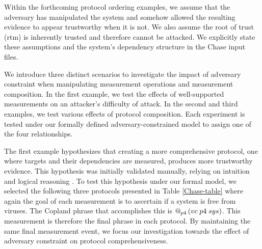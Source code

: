 \documentclass[runningheads]{llncs}
\theoremstyle{definition}
\begin{document}

%     

Within the forthcoming protocol ordering examples, we assume that the adversary has manipulated the system and somehow allowed the resulting evidence to appear trustworthy when it is not. We also assume the root of trust (rtm) is inherently trusted and therefore cannot be attacked. We explicitly state these assumptions and the system's dependency structure in the Chase input files.

We introduce three distinct scenarios to investigate the impact of adversary constraint when manipulating measurement operations and measurement composition. In the first example, we test the effects of well-supported measurements on an attacker's difficulty of attack. In the second and third examples, we test various effects of protocol composition. Each experiment is tested under our formally defined adversary-constrained model to assign one of the four relationships.

The first example hypothesizes that creating a more comprehensive protocol, one where targets and their dependencies are measured, produces more trustworthy evidence. This hypothesis was initially validated manually, relying on intuition and logical reasoning \cite{Rowe:2016:Confining}. To test this hypothesis under our formal model, we selected the following three protocols presented in Table \ref{Chase-table} where again the goal of each measurement is to ascertain if a system is free from viruses. The Copland phrase that accomplishes this is $\mathop{@_{p4}}{(vc\; p4\; sys)}$. This measurement is therefore the final phrase in each protocol. By maintaining the same final measurement event, we focus our investigation towards the effect of adversary constraint on protocol comprehensiveness.
\end{document}

